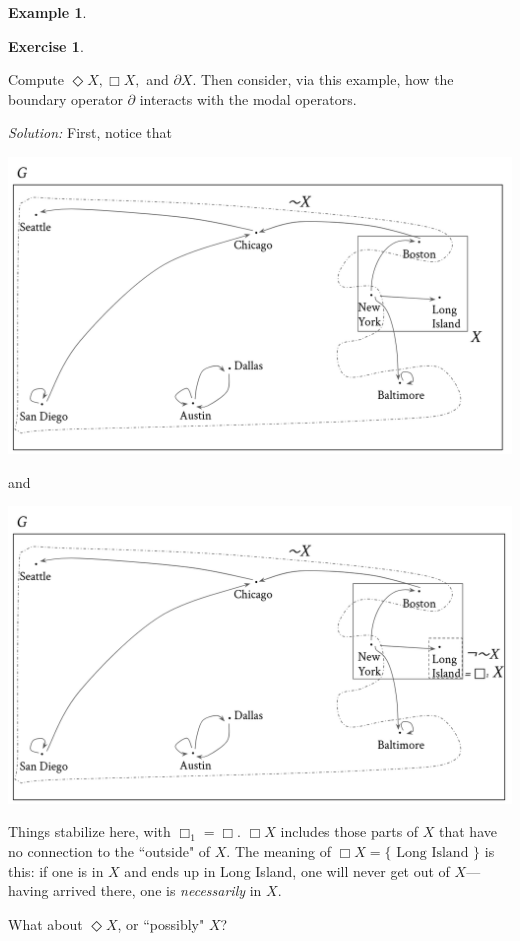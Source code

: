 \documentclass[11pt]{book}
\theoremstyle{definition}
\newtheorem{example}{Example}[section]
\theoremstyle{definition}
\theoremstyle{definition}
\theoremstyle{theorem}
\theoremstyle{definition}
\newtheorem{exercise}{Exercise}[section]
\begin{document}
\begin{example}
\begin{exercise}
\begin{center}
	\end{center}
Compute $\Diamond X, \Box X,$ and $\partial X$. Then consider, via this example, how the boundary operator $\partial$ interacts with the modal operators. 
\end{exercise} \par \noindent 
\textit{Solution:} First, notice that 
	\begin{center}
		\includegraphics*[scale=0.2]{RoutesGraph2.png}
	\end{center}
and 
	\begin{center}
		\includegraphics*[scale=0.2]{RoutesGraph3.png}
	\end{center}
	Things stabilize here, with $\Box_1 = \Box$. $\Box X$ includes those parts of $X$ that have no connection to the ``outside" of $X$. The meaning of $\Box X = \{\text{ Long Island }\}$ is this: if one is in $X$ and ends up in Long Island, one will never get out of $X$---having arrived there, one is \textit{necessarily} in $X$. \par 
	What about $\Diamond X$, or ``possibly" $X$?   

\end{example}
\end{document}
